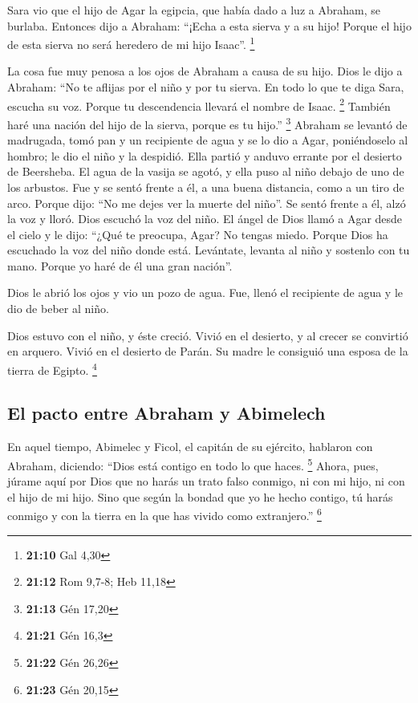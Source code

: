  Sara vio que el hijo de Agar la egipcia, que había dado a
luz a Abraham, se burlaba.  Entonces dijo a Abraham:
``¡Echa a esta sierva y a su hijo! Porque el hijo de esta sierva no será
heredero de mi hijo Isaac''. \footnote{\textbf{21:10} Gal 4,30}

 La cosa fue muy penosa a los ojos de Abraham a causa de
su hijo.  Dios le dijo a Abraham: ``No te aflijas por el
niño y por tu sierva. En todo lo que te diga Sara, escucha su voz.
Porque tu descendencia llevará el nombre de Isaac. \footnote{\textbf{21:12}
  Rom 9,7-8; Heb 11,18}  También haré una nación del hijo
de la sierva, porque es tu hijo.'' \footnote{\textbf{21:13} Gén 17,20}
 Abraham se levantó de madrugada, tomó pan y un
recipiente de agua y se lo dio a Agar, poniéndoselo al hombro; le dio el
niño y la despidió. Ella partió y anduvo errante por el desierto de
Beersheba.  El agua de la vasija se agotó, y ella puso al
niño debajo de uno de los arbustos.  Fue y se sentó
frente a él, a una buena distancia, como a un tiro de arco. Porque dijo:
``No me dejes ver la muerte del niño''. Se sentó frente a él, alzó la
voz y lloró.  Dios escuchó la voz del niño. El ángel de
Dios llamó a Agar desde el cielo y le dijo: ``¿Qué te preocupa, Agar? No
tengas miedo. Porque Dios ha escuchado la voz del niño donde está.
 Levántate, levanta al niño y sostenlo con tu mano.
Porque yo haré de él una gran nación''.

 Dios le abrió los ojos y vio un pozo de agua. Fue, llenó
el recipiente de agua y le dio de beber al niño.

 Dios estuvo con el niño, y éste creció. Vivió en el
desierto, y al crecer se convirtió en arquero.  Vivió en
el desierto de Parán. Su madre le consiguió una esposa de la tierra de
Egipto. \footnote{\textbf{21:21} Gén 16,3}

\hypertarget{el-pacto-entre-abraham-y-abimelech}{%
\subsection{El pacto entre Abraham y
Abimelech}\label{el-pacto-entre-abraham-y-abimelech}}

 En aquel tiempo, Abimelec y Ficol, el capitán de su
ejército, hablaron con Abraham, diciendo: ``Dios está contigo en todo lo
que haces. \footnote{\textbf{21:22} Gén 26,26}  Ahora,
pues, júrame aquí por Dios que no harás un trato falso conmigo, ni con
mi hijo, ni con el hijo de mi hijo. Sino que según la bondad que yo he
hecho contigo, tú harás conmigo y con la tierra en la que has vivido
como extranjero.'' \footnote{\textbf{21:23} Gén 20,15}

